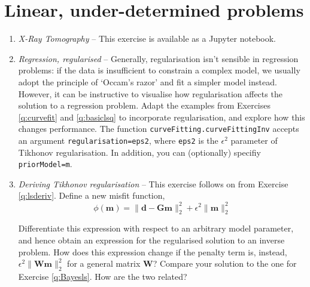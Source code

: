 \documentclass[a4paper,11pt]{article}
\begin{document}
\section{Linear, under-determined problems}
\begin{enumerate}[resume]
\item \textit{X-Ray Tomography} -- 
This exercise is available as a Jupyter notebook.

\item \textit{Regression, regularised} -- Generally, regularisation isn't sensible in regression problems: if the data is insufficient to constrain a complex model, we usually adopt the principle of `Occam's razor' and fit a simpler model instead. However, it can be instructive to visualise how regularisation affects the solution to a regression problem. Adapt the examples from Exercises \ref{q:curvefit} and \ref{q:basiclsq} to incorporate regularisation, and explore how this changes performance. The function \texttt{curveFitting.curveFittingInv} accepts an argument \texttt{regularisation=eps2}, where \texttt{eps2} is the $\epsilon^2$ parameter of Tikhonov regularisation. In addition, you can (optionally) specifiy \texttt{priorModel=m}.

\item \textit{Deriving Tikhonov regularisation}\label{q:tikderiv} --
This exercise follows on from Exercise \ref{q:lsderiv}. Define a new misfit function,
\[\phi(\mathbf{m}) = \|\mathbf{d}-\mathbf{Gm}\|_2^2 + \epsilon^2 \|\mathbf{m}\|_2^2\]

Differentiate this expression with respect to an arbitrary model parameter, and hence obtain an expression for the regularised solution to an inverse problem. How does this expression change if the penalty term is, instead, $\epsilon^2 \|\mathbf{Wm}\|_2^2$ for a general matrix $\mathbf{W}$? Compare your solution to the one for Exercise \ref{q:Bayesls}. How are the two related?



\end{enumerate}
\end{document}
